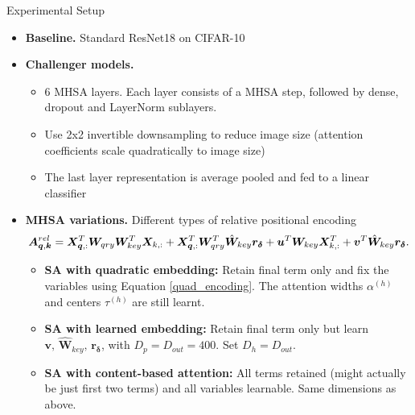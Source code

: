 \documentclass[9pt]{beamer}
\newcommand{\mb}{\bm}
\begin{document}
\begin{frame}{Experimental Setup}
\begin{itemize}
\item \textbf{Baseline.} Standard ResNet18 on CIFAR-10

\vspace{.02in}
\item \textbf{Challenger models.}
\begin{itemize}
    \item 6 MHSA layers. Each layer consists of a MHSA step, followed by dense, dropout and LayerNorm sublayers.
    \item Use 2x2 invertible downsampling to reduce image size (attention coefficients scale quadratically to image size)
    \item The last layer representation is average pooled and fed to a linear classifier
\end{itemize}

\vspace{.02in}
\item \textbf{MHSA variations.} Different types of relative positional encoding
\begin{equation*}
    \mb A^{rel}_{\mb q, \mb k} = 
        \mb X_{\mb q,:}^T \WW \mb X_{k,:}
        + \mb X_{\mb q,:}^T \mb W_{qry}^T\hat{\mb W}_{key} \mb r_{\mb \delta}
        + \mb u^T \mb W_{key} \mb X^T_{k,:}
        + \mb v^T \hat{\mb W}_{key} \mb r_{\bm\delta}.
    \vspace{-.12in}
\end{equation*}
\begin{itemize}
    \item \textbf{SA with quadratic embedding:}  Retain final term only and fix the variables using Equation \eqref{quad_encoding}. The attention widths $\alpha^{(h)}$ and centers $\tau^{(h)}$ are still learnt.
    \item \textbf{SA with learned embedding:} Retain final term only but learn $\mathbf v,\, \hat{\mathbf W}_{key},\, \mathbf r_{\bm \delta}$, with $D_p=D_{out}=400$. Set $D_h=D_{out}$.
    \item \textbf{SA with content-based attention:} All terms retained (might actually be just first two terms) and all variables learnable. Same dimensions as above.
\end{itemize}
\end{itemize}
\end{frame}
\end{document}
